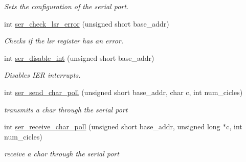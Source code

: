 \begin{DoxyCompactItemize}
\begin{DoxyCompactList}\small\item\em Sets the configuration of the serial port. \end{DoxyCompactList}\item 
int \hyperlink{group__ser__port_gaf51d56fa6069ce68bb9f34a1396b2ea1}{ser\+\_\+check\+\_\+lsr\+\_\+error} (unsigned short base\+\_\+addr)
\begin{DoxyCompactList}\small\item\em Checks if the lsr register has an error. \end{DoxyCompactList}\item 
int \hyperlink{group__ser__port_ga46bbb861095c5b7a44a33af5e19be100}{ser\+\_\+disable\+\_\+int} (unsigned short base\+\_\+addr)
\begin{DoxyCompactList}\small\item\em Disables I\+ER interrupts. \end{DoxyCompactList}\item 
int \hyperlink{group__ser__port_ga9ce4605b9346d093f446fa48b495406b}{ser\+\_\+send\+\_\+char\+\_\+poll} (unsigned short base\+\_\+addr, char c, int num\+\_\+cicles)
\begin{DoxyCompactList}\small\item\em transmits a char through the serial port \end{DoxyCompactList}\item 
int \hyperlink{group__ser__port_gae9c2959fb0c4f39b96c4621d985f5ed2}{ser\+\_\+receive\+\_\+char\+\_\+poll} (unsigned short base\+\_\+addr, unsigned long $\ast$c, int num\+\_\+cicles)
\begin{DoxyCompactList}\small\item\em receive a char through the serial port \end{DoxyCompactList}\end{DoxyCompactItemize}
